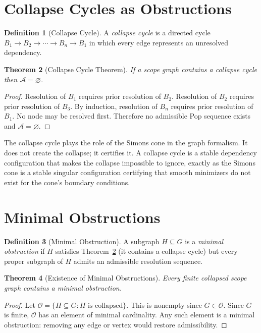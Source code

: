 \documentclass[12pt,oneside]{book}
\theoremstyle{plain}
\newtheorem{theorem}{Theorem}[chapter]
\theoremstyle{definition}
\newtheorem{definition}[theorem]{Definition}
\theoremstyle{remark}
\newcommand{\Admiss}{\mathcal{A}}
\begin{document}
\section{Collapse Cycles as Obstructions}

\begin{definition}[Collapse Cycle]
A \emph{collapse cycle} is a directed cycle $B_1 \to B_2 \to \cdots \to
B_n \to B_1$ in which every edge represents an unresolved dependency.
\end{definition}

\begin{theorem}[Collapse Cycle Theorem]
\label{thm:collapse-cycle}
If a scope graph contains a collapse cycle then $\Admiss = \varnothing$.
\end{theorem}

\begin{proof}
Resolution of $B_1$ requires prior resolution of $B_2$. Resolution of $B_2$
requires prior resolution of $B_3$. By induction, resolution of $B_n$
requires prior resolution of $B_1$. No node may be resolved first.
Therefore no admissible Pop sequence exists and $\Admiss = \varnothing$.
\end{proof}

The collapse cycle plays the role of the Simons cone in the graph formalism.
It does not create the collapse; it certifies it. A collapse cycle is a stable
dependency configuration that makes the collapse impossible to ignore,
exactly as the Simons cone is a stable singular configuration certifying that
smooth minimizers do not exist for the cone's boundary conditions.

\section{Minimal Obstructions}

\begin{definition}[Minimal Obstruction]
A subgraph $H \subseteq G$ is a \emph{minimal obstruction} if $H$ satisfies
Theorem~\ref{thm:collapse-cycle} (it contains a collapse cycle) but every
proper subgraph of $H$ admits an admissible resolution sequence.
\end{definition}

\begin{theorem}[Existence of Minimal Obstructions]
Every finite collapsed scope graph contains a minimal obstruction.
\end{theorem}

\begin{proof}
Let $\mathcal{O} = \{H \subseteq G : H \text{ is collapsed}\}$. This is
nonempty since $G \in \mathcal{O}$. Since $G$ is finite, $\mathcal{O}$
has an element of minimal cardinality. Any such element is a minimal
obstruction: removing any edge or vertex would restore admissibility.
\end{proof}
\end{document}
